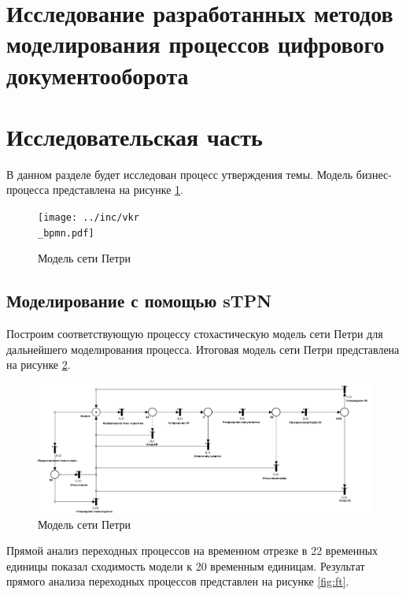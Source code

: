 \section{Исследование разработанных методов моделирования процессов цифрового документооборота}

\section{Исследовательская часть}

В данном разделе будет исследован процесс утверждения темы. Модель бизнес-процесса представлена на рисунке \ref{fig:vkrbpmn}.

\begin{figure}[h!btp]
	\centering
	\texttt{[image: ../inc/vkr\\\_bpmn.pdf]}
	\caption{Модель сети Петри}
	\label{fig:vkrbpmn}	
\end{figure}

\subsection{Моделирование с помощью sTPN}

Построим соответствующую процессу стохастическую модель сети Петри для дальнейшего моделирования процесса. Итоговая модель сети Петри представлена на рисунке \ref{fig:tpn}.

\begin{figure}[h!btp]
	\centering
	\includegraphics[width=\textwidth]{../inc/timed.pdf}
	\caption{Модель сети Петри}
	\label{fig:tpn}	
\end{figure}

Прямой анализ переходных процессов\cite{forward-transient} на временном отрезке в 22 временных единицы показал сходимость модели к 20 временным единицам. Результат прямого анализа переходных процессов представлен на рисунке \ref{fig:ft}.

